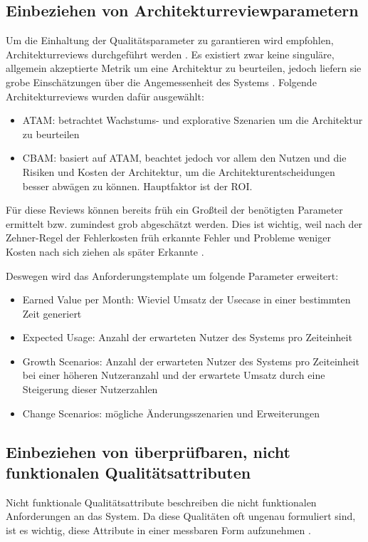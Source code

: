 \subsection{Einbeziehen von Architekturreviewparametern}
Um die Einhaltung der Qualitätsparameter zu garantieren wird empfohlen, Architekturreviews durchgeführt werden \cite[S. 20]{review}. Es existiert zwar \glqq keine singuläre, allgemein akzeptierte Metrik um eine Architektur zu beurteilen\grqq \cite[S. 19]{review}, jedoch liefern sie grobe Einschätzungen über die Angemessenheit des Systems \cite[S. 20]{review}. Folgende Architekturreviews wurden dafür ausgewählt:

\begin{itemize}
  \item ATAM: betrachtet Wachstums- und explorative Szenarien um die Architektur zu beurteilen \cite[S. 61]{review}
  \item CBAM: basiert auf ATAM, beachtet jedoch vor allem den Nutzen und die Risiken und Kosten der Architektur, um die Architekturentscheidungen besser abwägen zu können. Hauptfaktor ist der ROI. \cite[S. 67]{review}
\end{itemize}

Für diese Reviews können bereits früh ein Großteil der benötigten Parameter ermittelt bzw. zumindest grob abgeschätzt werden. Dies ist wichtig, weil nach der Zehner-Regel der Fehlerkosten früh erkannte Fehler und Probleme weniger Kosten nach sich ziehen als später Erkannte \cite[S. 154]{fehler}.

Deswegen wird das Anforderungstemplate um folgende Parameter erweitert:

\begin{itemize}
  \item Earned Value per Month: Wieviel Umsatz der Usecase in einer bestimmten Zeit generiert
  \item Expected Usage: Anzahl der erwarteten Nutzer des Systems pro Zeiteinheit
  \item Growth Scenarios: Anzahl der erwarteten Nutzer des Systems pro Zeiteinheit bei einer höheren Nutzeranzahl und der erwartete Umsatz durch eine Steigerung dieser Nutzerzahlen
  \item Change Scenarios: mögliche Änderungsszenarien und Erweiterungen
\end{itemize}

\subsection{Einbeziehen von überprüfbaren, nicht funktionalen Qualitätsattributen}
Nicht funktionale Qualitätsattribute beschreiben die nicht funktionalen Anforderungen an das System. Da diese Qualitäten oft ungenau formuliert sind, ist es wichtig, diese Attribute in einer messbaren Form aufzunehmen \cite[S. 9]{effektiv}.

